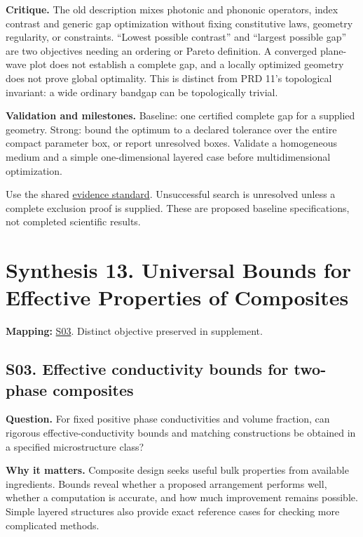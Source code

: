 \documentclass[
  11pt,
]{article}
\begin{document}
\textbf{Critique.} The old description mixes photonic and phononic
operators, index contrast and generic gap optimization without fixing
constitutive laws, geometry regularity, or constraints. ``Lowest
possible contrast'' and ``largest possible gap'' are two objectives
needing an ordering or Pareto definition. A converged plane-wave plot
does not establish a complete gap, and a locally optimized geometry does
not prove global optimality. This is distinct from PRD 11's topological
invariant: a wide ordinary bandgap can be topologically trivial.

\textbf{Validation and milestones.} Baseline: one certified complete gap
for a supplied geometry. Strong: bound the optimum to a declared
tolerance over the entire compact parameter box, or report unresolved
boxes. Validate a homogeneous medium and a simple one-dimensional
layered case before multidimensional optimization.

Use the shared
\href{https://github.com/rick-stevens-ai/Pure-Thought/blob/main/reviews/EVIDENCE-STANDARD.md}{evidence
standard}. Unsuccessful search is unresolved unless a complete exclusion
proof is supplied. These are proposed baseline specifications, not
completed scientific results.

\section{Synthesis 13. Universal Bounds for Effective Properties of
Composites}

\textbf{Mapping:}
\href{https://github.com/rick-stevens-ai/Pure-Thought/blob/main/supplemental/S03.md}{S03}.
Distinct objective preserved in supplement.

\subsection{S03. Effective conductivity bounds for two-phase composites}

\textbf{Question.} For fixed positive phase conductivities and volume
fraction, can rigorous effective-conductivity bounds and matching
constructions be obtained in a specified microstructure class?

\textbf{Why it matters.} Composite design seeks useful bulk properties
from available ingredients. Bounds reveal whether a proposed arrangement
performs well, whether a computation is accurate, and how much
improvement remains possible. Simple layered structures also provide
exact reference cases for checking more complicated methods.
\end{document}
